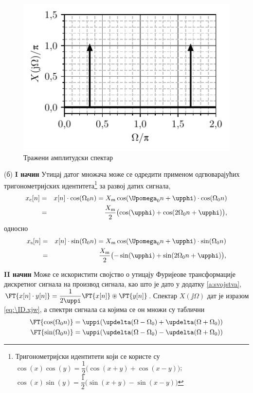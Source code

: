 \begin{figure}[ht!]
    \centering
    \includegraphics{fig/dirac_plot.pdf}
    \caption{Тражени амплитудски спектар}
    \label{fig:\ID.1}
\end{figure}

(б) \textbf{I начин} 
Утицај датог множача може се одредити применом одгвоварајућих тригонометријских 
идентитета\footnote{Тригонометријски идентитети који се користе су 
$\cos(x)\cos(y) = \dfrac{1}{2}\bigl(
\cos(x+y) + \cos(x-y)
\bigr)$;\quad
$\cos(x)\sin(y) = \dfrac{1}{2}\bigl(
\sin(x+y) - \sin(x-y)
\bigr)$} за развој датих сигнала,
\begin{eqnarray}
    x_{\rm c}[n] &=& x[n] \cdot \cos(\Omega_0 n) 
    = X_{\rm m} \cos(\Upomega_0 n + \upphi)  \cdot \cos(\Omega_0 n)
    \\
    &=& \dfrac{X_{\rm m}}{2} \bigl( \cos(\upphi) +  \cos(2\Omega_0 n + \upphi) \bigr),
    \label{eq:\ID.rez}
\end{eqnarray}
односно
\begin{eqnarray}
    x_{\rm s}[n] &=& x[n] \cdot \sin(\Omega_0 n) 
    = X_{\rm m} \cos(\Upomega_0 n + \upphi)  \cdot \sin(\Omega_0 n)
    \\
    &=& \dfrac{X_{\rm m}}{2} \bigl( -\sin(\upphi) + \sin(2\Omega_0 n + \upphi) \bigr),
\end{eqnarray}

\textbf{II начин} Може се искористити својство о утицају Фуријеове трансформације дискретног сигнала на 
производ сигнала, као што је дато у додатку \ref{a:svojstva}, 
$\FT{x[n]\cdot y[n]} = \dfrac{1}{2\uppi} \FT{x[n]} \circledast \FT{y[n]}$. Спектар $X(\jj\Omega)$ дат је изразом 
\eqref{eq:\ID.xjw}, а спектри сигнала са којима се он множи су таблични
\begin{eqnarray}
    \FT{\cos(\Omega_0 n)} = \uppi( \updelta(\Omega - \Omega_0)  +  \updelta(\Omega + \Omega_0)  )     \\
    \FT{\sin(\Omega_0 n)} = \uppi( \updelta(\Omega - \Omega_0)  -  \updelta(\Omega + \Omega_0)  )     
    \label{eq:\ID.sincos}
\end{eqnarray}

